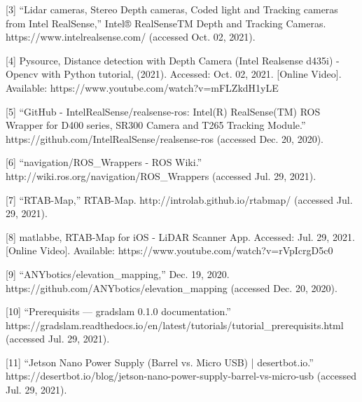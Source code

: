 \documentclass{article}
\begin{document}
[3]	“Lidar cameras, Stereo Depth cameras, Coded light and Tracking cameras from Intel RealSense,” Intel® RealSenseTM Depth and Tracking Cameras. https://www.intelrealsense.com/ (accessed Oct. 02, 2021).
\bigskip

[4]	Pysource, Distance detection with Depth Camera (Intel Realsense d435i) - Opencv with Python tutorial, (2021). Accessed: Oct. 02, 2021. [Online Video]. Available: https://www.youtube.com/watch?v=mFLZkdH1yLE
\bigskip

[5]	“GitHub - IntelRealSense/realsense-ros: Intel(R) RealSense(TM) ROS Wrapper for D400 series, SR300 Camera and T265 Tracking Module.” \\ https://github.com/IntelRealSense/realsense-ros (accessed Dec. 20, 2020).
\bigskip

[6]	“navigation/ROS\_Wrappers - ROS Wiki.” \\http://wiki.ros.org/navigation/ROS\_Wrappers (accessed Jul. 29, 2021).
\bigskip

[7]	“RTAB-Map,” RTAB-Map. http://introlab.github.io/rtabmap/ (accessed Jul. 29, 2021).
\bigskip

[8]	matlabbe, RTAB-Map for iOS - LiDAR Scanner App. Accessed: Jul. 29, 2021. [Online Video]. Available: https://www.youtube.com/watch?v=rVpIcrgD5c0
\bigskip

[9]	“ANYbotics/elevation\_mapping,” Dec. 19, 2020.\\ https://github.com/ANYbotics/elevation\_mapping (accessed Dec. 20, 2020).
\bigskip

[10]	“Prerequisits — gradslam 0.1.0 documentation.”\\ https://gradslam.readthedocs.io/en/latest/tutorials/tutorial\_prerequisits.html (accessed Jul. 29, 2021).
\bigskip

[11]	“Jetson Nano Power Supply (Barrel vs. Micro USB) | desertbot.io.” https://desertbot.io/blog/jetson-nano-power-supply-barrel-vs-micro-usb (accessed Jul. 29, 2021).
\end{document}
